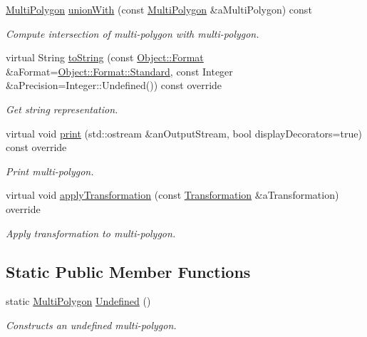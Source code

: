 \begin{DoxyCompactItemize}
\hyperlink{classostk_1_1math_1_1geom_1_1d2_1_1objects_1_1_multi_polygon}{Multi\+Polygon} \hyperlink{classostk_1_1math_1_1geom_1_1d2_1_1objects_1_1_multi_polygon_a0762c6a4b4aaa70082394df690f3c96c}{union\+With} (const \hyperlink{classostk_1_1math_1_1geom_1_1d2_1_1objects_1_1_multi_polygon}{Multi\+Polygon} \&a\+Multi\+Polygon) const
\begin{DoxyCompactList}\small\item\em Compute intersection of multi-\/polygon with multi-\/polygon. \end{DoxyCompactList}\item 
virtual String \hyperlink{classostk_1_1math_1_1geom_1_1d2_1_1objects_1_1_multi_polygon_abf52343dc62ec2d62d971bef636f6c1c}{to\+String} (const \hyperlink{classostk_1_1math_1_1geom_1_1d2_1_1_object_aa76f9e30caebf4005bafbdff447f66cf}{Object\+::\+Format} \&a\+Format=\hyperlink{classostk_1_1math_1_1geom_1_1d2_1_1_object_aa76f9e30caebf4005bafbdff447f66cfaeb6d8ae6f20283755b339c0dc273988b}{Object\+::\+Format\+::\+Standard}, const Integer \&a\+Precision=Integer\+::\+Undefined()) const override
\begin{DoxyCompactList}\small\item\em Get string representation. \end{DoxyCompactList}\item 
virtual void \hyperlink{classostk_1_1math_1_1geom_1_1d2_1_1objects_1_1_multi_polygon_ab7a22decd4f9409b08e1b0e6b2bd60ef}{print} (std\+::ostream \&an\+Output\+Stream, bool display\+Decorators=true) const override
\begin{DoxyCompactList}\small\item\em Print multi-\/polygon. \end{DoxyCompactList}\item 
virtual void \hyperlink{classostk_1_1math_1_1geom_1_1d2_1_1objects_1_1_multi_polygon_a2dfac474c7787aac7ea0822e409bbff5}{apply\+Transformation} (const \hyperlink{classostk_1_1math_1_1geom_1_1d2_1_1_transformation}{Transformation} \&a\+Transformation) override
\begin{DoxyCompactList}\small\item\em Apply transformation to multi-\/polygon. \end{DoxyCompactList}\end{DoxyCompactItemize}
\subsection*{Static Public Member Functions}
\begin{DoxyCompactItemize}
\item 
static \hyperlink{classostk_1_1math_1_1geom_1_1d2_1_1objects_1_1_multi_polygon}{Multi\+Polygon} \hyperlink{classostk_1_1math_1_1geom_1_1d2_1_1objects_1_1_multi_polygon_aa80a7642515417486bb846f869120fcd}{Undefined} ()
\begin{DoxyCompactList}\small\item\em Constructs an undefined multi-\/polygon. \end{DoxyCompactList}\end{DoxyCompactItemize}
